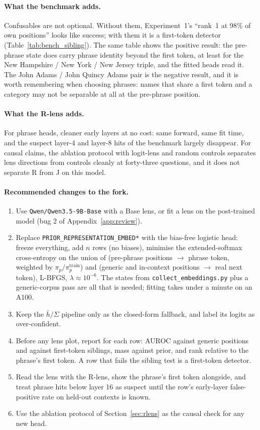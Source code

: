 \documentclass[11pt]{article}
\renewcommand{\hbar}{\bar{h}}
\begin{document}
\paragraph{What the benchmark adds.}
Confusables are not optional. Without them, Experiment~1's ``rank~1 at 98\% of own positions'' looks like success; with them it is a first-token detector (Table~\ref{tab:bench_sibling}). The same table shows the positive result: the pre-phrase state does carry phrase identity beyond the first token, at least for the New Hampshire / New York / New Jersey triple, and the fitted heads read it. The John Adams / John Quincy Adams pair is the negative result, and it is worth remembering when choosing phrases: names that share a first token and a category may not be separable at all at the pre-phrase position.

\paragraph{What the R-lens adds.}
For phrase heads, cleaner early layers at no cost: same forward, same fit time, and the suspect layer-4 and layer-8 hits of the benchmark largely disappear. For causal claims, the ablation protocol with logit-lens and random controls separates lens directions from controls cleanly at forty-three questions, and it does not separate R from J on this model.

\paragraph{Recommended changes to the fork.}
\begin{enumerate}[leftmargin=1.6em,itemsep=2pt]
\item Use \texttt{Qwen/Qwen3.5-9B-Base} with a Base lens, or fit a lens on the post-trained model (bug 2 of Appendix~\ref{app:review}).
\item Replace \texttt{PRIOR\_REPRESENTATION\_EMBED*} with the bias-free logistic head: freeze everything, add $n$ rows (no biases), minimise the extended-softmax cross-entropy on the union of (pre-phrase positions $\to$ phrase token, weighted by $\pi_p/\pi_p^{\mathrm{train}}$) and (generic and in-context positions $\to$ real next token), L-BFGS, $\lambda\approx10^{-6}$. The states from \texttt{collect\_embeddings.py} plus a generic-corpus pass are all that is needed; fitting takes under a minute on an A100.
\item Keep the $\hbar/\Sigma$ pipeline only as the closed-form fallback, and label its logits as over-confident.
\item Before any lens plot, report for each row: AUROC against generic positions and against first-token siblings, mass against prior, and rank relative to the phrase's first token. A row that fails the sibling test is a first-token detector.
\item Read the lens with the R-lens, show the phrase's first token alongside, and treat phrase hits below layer 16 as suspect until the row's early-layer false-positive rate on held-out contexts is known.
\item Use the ablation protocol of Section~\ref{sec:rlens} as the causal check for any new head.
\end{enumerate}
\end{document}
